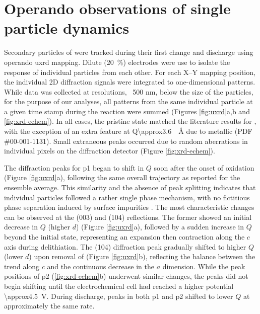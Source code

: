 \documentclass{article}
\begin{document}
\section{Operando observations of single particle dynamics}


Secondary particles of \nca{} were tracked during their
first change and discharge using operando \gls{uxrd} mapping. Dilute (\SI{20}{\percent}) \nca{} electrodes were use to isolate the response of individual particles from each other. For each
X--Y mapping position, the individual 2D diffraction signals were integrated to one-dimensional patterns. While data was collected at resolutions, ~500 nm, below the size of the particles, for the purpose of our analyses, all patterns from the same individual particle at a given time stamp during the reaction were summed (Figures \ref{fig:uxrd}a,b and \ref{fig:xrd-echem}). In all cases, the pristine state matched the literature results for \nca{}
\cite{novak2015}, with the exception of an extra feature at Q\SI{\approx3.6}{\per\angstrom} due to metallic  (PDF \#00-001-1131). Small extraneous peaks occurred due to random aberrations in individual pixels on the diffraction detector (Figure \ref{fig:xrd-echem}).

The diffraction peaks for \gls{p1} began to shift in $Q$ soon after
the onset of oxidation (Figure \ref{fig:uxrd}a), following the same overall trajectory as reported for the ensemble average\cite{robert2015}. This similarity and the absence of peak splitting indicates that individual particles followed a rather single phase mechanism, with no fictitious phase separation induced by surface impurities \cite{grenier2017}. The most characteristic changes can be observed at the (003) and (104) reflections. The former showed an initial decrease in $Q$ (higher $d$)
(Figure \ref{fig:uxrd}a), followed by a sudden
increase in $Q$ beyond the initial state, representing an expansion then contraction along the $c$ axis during delithiation\citeme{}. The (104) diffraction peak gradually
shifted to higher $Q$ (lower $d$) upon removal of  (Figure \ref{fig:uxrd}b), reflecting the balance
between the trend along $c$ and the continuous decrease in the $a$
dimension.\cite{robert2015} While the peak
positions of \gls{p2} (\ref{fig:xrd-echem}b) underwent similar changes, the peaks did not begin shifting
until the electrochemical cell had reached a higher potential
\SI{\approx4.5}{\volt}. During discharge, peaks in both \gls{p1} and
\gls{p2} shifted to lower $Q$ at approximately the same rate. 
\end{document}
